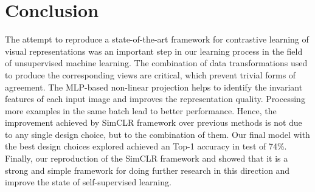 \documentclass{article}
\begin{document}
\section{Conclusion}

The attempt to reproduce a state-of-the-art framework for contrastive learning of visual representations was an important step in our learning process in the field of unsupervised machine learning. The combination of data transformations used to produce the corresponding views are critical, which prevent trivial forms of agreement. The MLP-based non-linear projection helps to identify the invariant features of each input image and improves the representation quality. Processing more examples in the same batch lead to better performance. Hence, the improvement achieved by SimCLR framework over previous methods is not due to any single design choice, but to the combination of them. Our final model with the best design choices explored achieved an Top-1 accuracy in test of 74\%. Finally, our reproduction of the SimCLR framework and showed that it is a strong and simple framework for doing further research in this direction and improve the state of self-supervised learning.


\printbibliography
\end{document}
